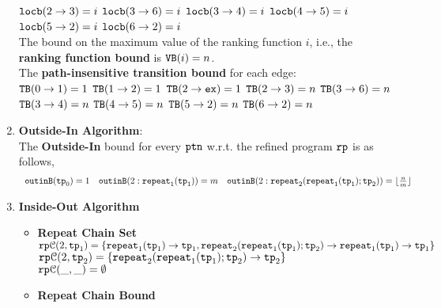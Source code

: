 \begin{enumerate}
      \quad $\mathtt{locb}(2 \to 3) = i$ 
      \quad $\mathtt{locb}(3 \to 6) = i$ 
      \quad $\mathtt{locb}(3 \to 4) = i$ 
      \quad $\mathtt{locb}(4 \to 5) = i$ 
      \quad $\mathtt{locb}(5 \to 2) = i$ 
      \quad $\mathtt{locb}(6 \to 2) = i$ 
      \\
  The bound on the maximum value of the ranking function $i$, i.e., the \textbf{ranking function bound} is
    ${\mathtt{VB}}(i) = n$.
    \\
    The \textbf{path-insensitive transition bound} for each edge:
    \\  
      ${\mathtt{TB}}(0 \to 1) = 1$
      \quad ${\mathtt{TB}}(1 \to 2) = 1$
      \quad ${\mathtt{TB}}(2 \to \mathtt{ex}) = 1$ 
      \quad ${\mathtt{TB}}(2 \to 3) = n$ 
      \quad ${\mathtt{TB}}(3 \to 6) = n$ 
      \\
      \quad ${\mathtt{TB}}(3 \to 4) = n$ 
      \quad ${\mathtt{TB}}(4 \to 5) = n$ 
      \quad ${\mathtt{TB}}(5 \to 2) = n$ 
      \quad ${\mathtt{TB}}(6 \to 2) = n$ 
  \item \textbf{Outside-In Algorithm}:\\
  The \textbf{Outside-In} bound for every $\mathtt{ptn}$ w.r.t. the refined program $\mathtt{rp}$ is as follows,
  \[
    \begin{array}{lll}
        \mathtt{outinB}(\mathtt{tp}_0) = 1
        &
        \mathtt{outinB}(2: \mathtt{repeat}_1(\mathtt{tp}_1)) = m 
        &
        \mathtt{outinB}(2: \mathtt{repeat}_2(\mathtt{repeat}_1(\mathtt{tp}_1); \mathtt{tp}_2)) = \lfloor\frac{n}{m}\rfloor
\end{array}
\]
\item \textbf{Inside-Out Algorithm}
\begin{itemize}
  \item \textbf{Repeat Chain Set}
  \\
  $\mathtt{rp}\mathcal{C}(2, \mathtt{tp}_1) = \{\mathtt{repeat}_1(\mathtt{tp}_1) \to \mathtt{tp}_1, \mathtt{repeat}_2(\mathtt{repeat}_1(\mathtt{tp}_1); \mathtt{tp}_2) \to \mathtt{repeat}_1(\mathtt{tp}_1) \to \mathtt{tp}_1\}$ \\
  $\mathtt{rp}\mathcal{C}(2, \mathtt{tp}_2) = \{\mathtt{repeat}_2(\mathtt{repeat}_1(\mathtt{tp}_1); \mathtt{tp}_2) \to  \mathtt{tp}_2\}$ \\
  $\mathtt{rp}\mathcal{C}(\_, \_) = \emptyset$ 
  \item \textbf{Repeat Chain Bound}

\end{itemize}
\end{enumerate}
